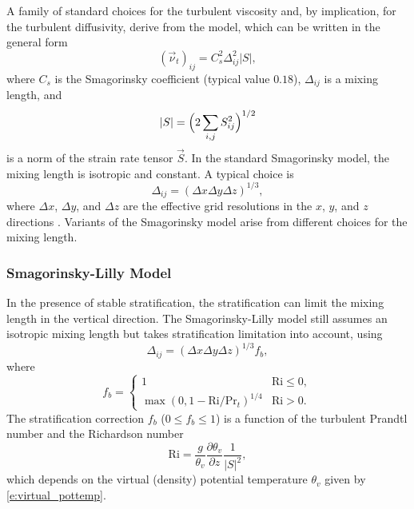 \documentclass{report}
\begin{document}
A family of standard choices for the turbulent viscosity and, by implication, for the turbulent diffusivity, derive from the \citet{smagorinsky:1963} model, which can be written in the general form 
\begin{equation}
(\vec{\nu}_t)_{ij} = C_{s}^2 \Delta^{2}_{ij} |S|,   
\label{eq:eddy-viscosity_smag}
\end{equation}
where $C_{s} $ is the Smagorinsky coefficient (typical value $0.18$), $\Delta_{ij}$ is a mixing length, and 
\begin{equation}
|S| = \Bigl(2 \sum_{i,j} S_{ij}^2 \Bigr)^{1/2}
\end{equation} 
is a norm of the strain rate tensor $\vec{S}$. In the standard Smagorinsky model, the mixing length is isotropic and constant. A typical choice is 
\begin{equation}
    \Delta_{ij} = (\Delta x \Delta y \Delta z)^{1/3},
\end{equation}
where $\Delta x$, $\Delta y$, and $\Delta z$ are the effective grid resolutions in the $x$, $y$, and $z$ directions \citep{deardorff1970}. Variants of the Smagorinsky model arise from different choices for the mixing length.

\subsubsection{Smagorinsky-Lilly Model}

In the presence of stable stratification, the stratification can limit the mixing length  in the vertical direction. The Smagorinsky-Lilly model \citep{smagorinsky:1963, lilly:1962} still assumes an isotropic mixing length  but takes stratification limitation into account, using 
\begin{equation}\label{eq:smag-lilly}
\Delta_{ij} = (\Delta x \Delta y \Delta z)^{1/3} f_{b},   
\end{equation}
where 
\begin{equation}\label{eq:Lilly_strat}
f_{b} = 
    \begin{cases}
    1 & \mathrm{Ri} \leq 0 ,\\
    \max(0, 1 - \mathrm{Ri} / \mathrm{Pr}_{t})^{1/4} & \mathrm{Ri} > 0 .
    \end{cases}
\end{equation}
The stratification correction $f_{b}$ ($0 \leq f_b \leq 1$) is a function of the turbulent Prandtl number  and the Richardson number 
\[
\mathrm{Ri} = \frac{g}{\theta_v} \frac{\partial \theta_v}{\partial z} \frac{1}{{|S|}^2},
\]
which depends on the virtual (density) potential temperature $\theta_v$ given by \eqref{e:virtual_pottemp}.
 
\end{document}
